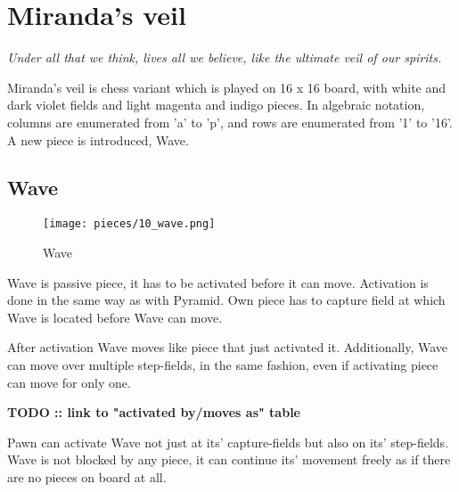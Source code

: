 
\chapter*{Miranda's veil}

\begin{flushright}
\parbox{0.8\textwidth}{
\emph{Under all that we think, lives all we believe, like the ultimate veil of our spirits. \\
 } }
\end{flushright}

\noindent
Miranda's veil is chess variant which is played on 16 x 16 board, with
white and dark violet fields and light magenta and indigo pieces. In
algebraic notation, columns are enumerated from 'a' to 'p', and rows
are enumerated from '1' to '16'. A new piece is introduced, Wave.

\clearpage %

\section*{Wave}

\noindent
\begin{wrapfigure}[12]{l}{0.4\textwidth}
\texttt{[image: pieces/10\_wave.png]}
\caption{Wave}
\label{fig:wave}
\end{wrapfigure}
Wave is passive piece, it has to be activated before it can move.
Activation is done in the same way as with Pyramid. Own piece
has to capture field at which Wave is located before Wave can
move.

After activation Wave moves like piece that just activated it.
Additionally, Wave can move over multiple step-fields, in the same
fashion, even if activating piece can move for only one.

\textbf{\huge{TODO :: link to "activated by/moves as" table}} %

Pawn can activate Wave not just at its' capture-fields but also on its'
step-fields. Wave is not blocked by any piece, it can continue its'
movement freely as if there are no pieces on board at all.

